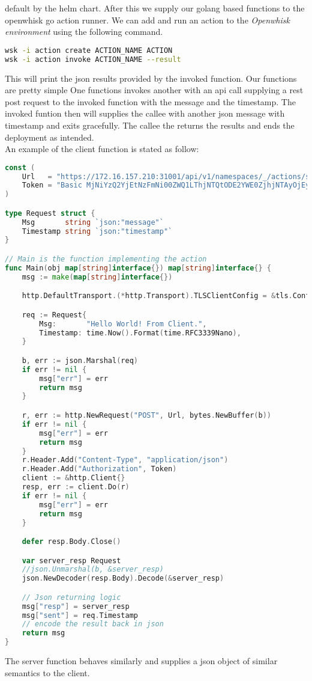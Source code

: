 \documentclass[a4paper, 11pt]{article}
\theoremstyle{nonumberplain}
\begin{document}
default by the helm chart. After this we supply our golang based functions to
the openwhisk go action runner.
We can add and run an action to the \textit{Openwhisk
environment} using the following command.
\begin{lstlisting}[language=bash]
wsk -i action create ACTION_NAME ACTION
wsk -i action invoke ACTION_NAME --result
\end{lstlisting}
This will print the json results provided by the invoked function.
Our functions are pretty simple One functions invokes another with an
api call supplying a rest post request to the invoked function with the message
and the timestamp. The invoked funtion then will supplies the callee with
another json message with timestamp and exits gracefully. The callee the
returns the results and ends the deployment as intended. \\
An example of the client function is stated as follow:
\begin{lstlisting}[language=go]
const (
	Url   = "https://172.16.157.210:31001/api/v1/namespaces/_/actions/server?blocking=true&result=true"
	Token = "Basic MjNiYzQ2YjEtNzFmNi00ZWQ1LThjNTQtODE2YWE0ZjhjNTAyOjEyM3pPM3haQ0xyTU42djJCS0sxZFhZRnBYbFBrY2NPRnFtMTJDZEFzTWdSVTRWck5aOWx5R1ZDR3VNREdJd1A="
)

type Request struct {
	Msg       string `json:"message"`
	Timestamp string `json:"timestamp"`
}

// Main is the function implementing the action
func Main(obj map[string]interface{}) map[string]interface{} {
	msg := make(map[string]interface{})

	http.DefaultTransport.(*http.Transport).TLSClientConfig = &tls.Config{InsecureSkipVerify: true}

	req := Request{
		Msg:       "Hello World! From Client.",
		Timestamp: time.Now().Format(time.RFC3339Nano),
	}

	b, err := json.Marshal(req)
	if err != nil {
		msg["err"] = err
		return msg
	}

	r, err := http.NewRequest("POST", Url, bytes.NewBuffer(b))
	if err != nil {
		msg["err"] = err
		return msg
	}
	r.Header.Add("Content-Type", "application/json")
	r.Header.Add("Authorization", Token)
	client := &http.Client{}
	resp, err := client.Do(r)
	if err != nil {
		msg["err"] = err
		return msg
	}

	defer resp.Body.Close()

	var server_resp Request
	//json.Unmarshal(b, &server_resp)
	json.NewDecoder(resp.Body).Decode(&server_resp)

	// Json returning logic
	msg["resp"] = server_resp
	msg["sent"] = req.Timestamp
	// encode the result back in json
	return msg
}

\end{lstlisting}
The server function behaves similarly and supplies a json object of similar
semantics to the client.
\end{document}
